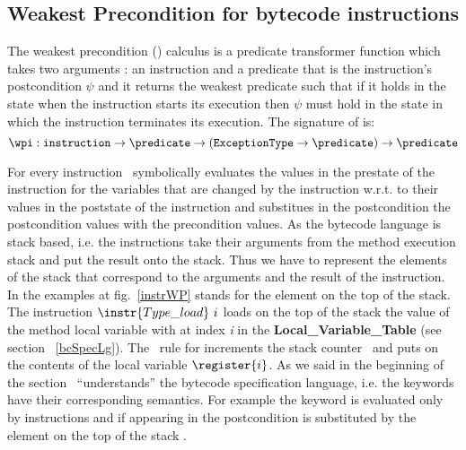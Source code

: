 \subsection{Weakest Precondition for bytecode instructions}\label{wpInstr}
The weakest precondition (\wpi) calculus is a predicate transformer function which takes two arguments : an instruction and a predicate that is the instruction's postcondition $\psi$ and it returns the weakest predicate such that if it holds in the state when the instruction starts its execution then $\psi$ must hold in the state in which the instruction terminates its execution. The signature of \wpi is:
$$\wpi : \texttt{instruction} \rightarrow \predicate \rightarrow (\tt{ ExceptionType} \rightarrow  \predicate) \rightarrow \predicate   $$

For every instruction \wpi \ symbolically evaluates the values in the prestate of the instruction for the variables that 
are changed by the instruction w.r.t. to their values in the poststate of the instruction and substitues in the postcondition the
 postcondition values with the precondition values. As the bytecode language is stack based, i.e. 
 the instructions take their arguments from the method execution stack and put the result onto the stack. 
 Thus we have to represent the elements of the stack that correspond to the arguments and the result of the instruction. 
 In the examples at fig.~\ref{instrWP} \stack{\counter} stands for the element on the top of the stack. 
 The instruction $\instr{Type\_load} \ i$  loads on the top of the stack the value of the method local variable with at index \textit{i} in the \textbf{Local\_Variable\_Table} (see section ~\ref{bcSpecLg}). The \wpi \ rule for   increments the stack
counter \counter \ and puts on \stack{\counter} the contents of the local variable $\register{i}$.
As we said in the beginning of the section \wpi \ ``understands'' the bytecode specification language, i.e. the keywords have their corresponding semantics. For example the keyword  is evaluated only by  instructions and if appearing in the postcondition   is substituted by the element on the top of the stack \stack{\counter}. 

